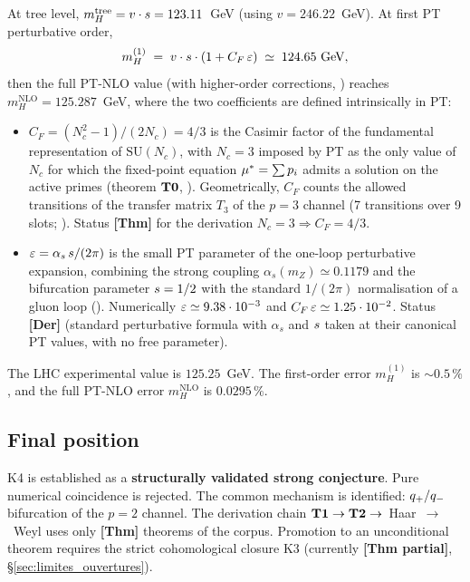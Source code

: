 At tree level, $m_H^{\mathrm{tree}} = v \cdot s = 123.11$~GeV
(using $v = 246.22$~GeV). At first PT perturbative order,
\begin{equation}
m_H^{(1)} \;=\; v \cdot s \cdot (1 + C_F\,\varepsilon) \;\simeq\; 124.65 \text{ GeV},
\label{eq:mH_1}
\end{equation}
then the full PT-NLO value (with higher-order corrections,
\cite{PT_M5}) reaches
$m_H^{\mathrm{NLO}} = 125.287$~GeV, where the two coefficients are
defined intrinsically in PT:
\begin{itemize}[nosep,leftmargin=*]
\item $C_F = (N_c^{2} - 1)/(2 N_c) = 4/3$ is the Casimir factor of
the fundamental representation of $\mathrm{SU}(N_c)$, with $N_c = 3$
imposed by PT as the only value of $N_c$ for which the fixed-point
equation $\mu^{*} = \sum p_i$ admits a solution on the active primes
(theorem $\textbf{T0}$, \cite{PT_M3}). Geometrically, $C_F$
counts the allowed transitions of the transfer matrix $T_3$ of the
$p = 3$ channel (7 transitions over 9 slots;
\cite{PT_M5}). Status \textbf{[Thm]} for
the derivation $N_c = 3 \Rightarrow C_F = 4/3$.
\item $\varepsilon = \alpha_s\,s / (2\pi)$ is the small PT parameter of
the one-loop perturbative expansion, combining the strong coupling
$\alpha_s(m_Z) \simeq 0.1179$ and the bifurcation parameter
$s = 1/2$ with the standard $1/(2\pi)$ normalisation of a gluon
loop (\cite{PT_M5}).
Numerically $\varepsilon \simeq 9.38 \cdot 10^{-3}$ and
$C_F\,\varepsilon \simeq 1.25 \cdot 10^{-2}$. Status \textbf{[Der]}
(standard perturbative formula with $\alpha_s$ and $s$ taken at
their canonical PT values, with no free parameter).
\end{itemize}

The LHC experimental value is $125.25$~GeV. The first-order error
$m_H^{(1)}$ is $\sim 0.5\,\%$, and the full PT-NLO error
$m_H^{\mathrm{NLO}}$ is $0.0295\,\%$.

\subsection{Final position}
\label{sec:K4_position}

K4 is established as a \textbf{structurally validated strong
conjecture}. Pure numerical coincidence is rejected. The common
mechanism is identified: $q_{+}/q_{-}$ bifurcation of the $p = 2$
channel. The derivation chain $\textbf{T1} \to \textbf{T2} \to$~Haar~$\to$~Weyl
uses only \textbf{[Thm]} theorems of the corpus. Promotion to an
unconditional theorem requires the strict cohomological closure K3
(currently \textbf{[Thm partial]}, \S\ref{sec:limites_ouvertures}).
